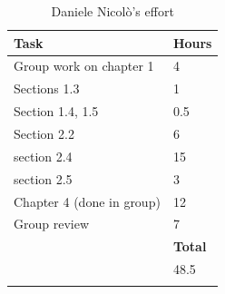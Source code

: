 \documentclass[titlepage]{article}
\begin{document}
	
	
	\begin{longtable}{| p{12 cm} | p{2 cm} |} 
		\hline
		{\bf Task} & {\bf Hours}\\
		\hline
		 Group work on chapter 1 & 4 \\
		 Sections 1.3 & 1 \\
		 Section 1.4, 1.5 & 0.5 \\
		 Section 2.2 & 6\\ 
		 section 2.4 & 15 \\
		 section 2.5 & 3 \\
		 Chapter 4 (done in group)& 12 \\
		 Group review & 7\\
		\hline
		&  {\bf Total} \\
		\hline
		&  48.5 \\
		\hline
		\caption{Daniele Nicolò's effort}
	\end{longtable}
\end{document}
